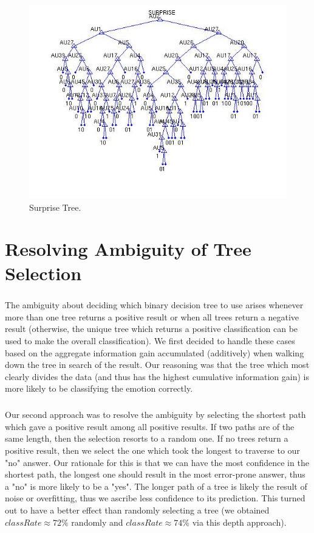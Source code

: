 \documentclass[a4paper,12pt,oneside,final]{report}
\newenvironment{changemargin}[2]{\begin{list}{}{%
\setlength{\topsep}{0pt}%
\setlength{\leftmargin}{0pt}%
\setlength{\rightmargin}{0pt}%
\setlength{\listparindent}{\parindent}%
\setlength{\itemindent}{\parindent}%
\setlength{\parsep}{0pt plus 1pt}%
\addtolength{\leftmargin}{#1}%
\addtolength{\rightmargin}{#2}%
}\item }{\end{list}}
\begin{document}
\begin{figure}[!h]
\begin{changemargin}{-20mm}{-20mm}
\center
\includegraphics[scale=1]{surprise.jpg}
\caption{Surprise Tree.}
\end{changemargin}
\end{figure}
\FloatBarrier

\chapter{Resolving Ambiguity of Tree Selection}
\label{ch:ambig}
\paragraph{}
The ambiguity about deciding which binary decision tree to use arises whenever more than one tree returns a positive result or when all trees return a negative result (otherwise, the unique tree which returns a positive classification can be used to make the overall classification).  We first decided to handle these cases based on the aggregate information gain accumulated (additively) when walking down the tree in search of the result.  Our reasoning was that the tree which most clearly divides the data (and thus has the highest cumulative information gain) is more likely to be classifying the emotion correctly. 

\paragraph{}
Our second approach was to resolve the ambiguity by selecting the shortest path which gave a positive result among all positive results. If two paths are of the same length, then the selection resorts to a random one.  If no trees return a positive result, then we select the one which took the longest to traverse to our "no" answer.  Our rationale for this is that we can have the most confidence in the shortest path, the longest one should result in the most error-prone answer, thus a "no" is more likely to be a "yes".  The longer path of a tree is likely the result of noise or overfitting, thus we ascribe less confidence to its prediction.  This turned out to have a better effect than randomly selecting a tree (we obtained $classRate \approx 72\%$ randomly and $classRate \approx 74\%$ via this depth approach).
\end{document}
